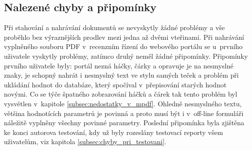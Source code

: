 \subsection{Nalezené chyby a připomínky}
Při stahování a nahrávání dokumentů se nevyskytly žádné problémy a vše proběhlo bez výraznějších prodlev mezi jedna až dvěmi vteřinami. Při nahrávání vyplněného souboru PDF v~recenzním řízení do webového portálu se u~prvního uživatele vyskytly problémy, zatímco druhý neměl žádné připomínky. Připomínky prvního uživatele byly: portál nezná háčky, čárky a opravuje je na nesmyslné znaky, je schopný nahrát i nesmyslný text ve stylu samých teček a problém při ukládání hodnot do databáze, který spočíval v~přepisování starých hodnot novými. Co se týče špatného zobrazování háčků a čárek tak tento problém byl vysvětlen v~kapitole \ref{subsec:nedostatky_v_mpdf}. Ohledně nesmyslného textu, většina hodnotících parametrů je povinná a proto musí být i v~off-line formuláři náležitě vyplněny všechny povinné parametry. Poslední připomínka byla zjištěna ke konci autorova testování, kdy už byly rozeslány testovací reporty všem uživatelům, viz kapitola \ref{subsec:chyby_pri_testovani}.  

 